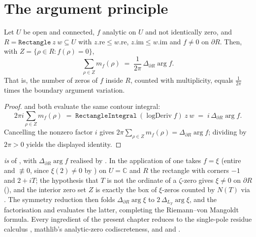 \section{The argument principle}
\label{sec:ap_main}

\begin{theorem}
\label{thm:ap_main}
\leanok
{}
Let $U$ be open and connected, $f$ analytic on $U$ and not identically zero, and
$R=\texttt{Rectangle}\ z\ w\subseteq U$ with $z.\mathrm{re}\le w.\mathrm{re}$,
$z.\mathrm{im}\le w.\mathrm{im}$ and $f\neq0$ on $\partial R$. Then, with
$Z=\{\rho\in R:f(\rho)=0\}$,
\[
  \sum_{\rho\in Z} m_f(\rho)
  \;=\; \frac{1}{2\pi}\,\Delta_{\partial R}\arg f .
\]
That is, the number of zeros of $f$ inside $R$, counted with multiplicity, equals
$\tfrac{1}{2\pi}$ times the boundary argument variation.
\end{theorem}

\begin{proof}
\leanok
{}
 and  both evaluate the same
contour integral:
\[
  2\pi i \sum_{\rho\in Z} m_f(\rho)
  \;=\; \texttt{RectangleIntegral}\ (\operatorname{logDeriv} f)\ z\ w
  \;=\; i\,\Delta_{\partial R}\arg f .
\]
Cancelling the nonzero factor $i$ gives $2\pi\sum_{\rho\in Z} m_f(\rho)
=\Delta_{\partial R}\arg f$; dividing by $2\pi>0$ yields the displayed identity.
\end{proof}

\begin{remark}
\label{rem:ap_scope}
 \emph{is}  of , with
$\Delta_{\partial R}\arg f$ realised by . In the application
of  one takes $f=\xi$ (entire and $\not\equiv0$, since
$\xi(2)\neq0$ by ) on $U=\mathbb C$ and $R$ the rectangle with
corners $-1$ and $2+iT$; the hypothesis that $T$ is not the ordinate of a $\zeta$-zero
gives $\xi\neq0$ on $\partial R$ (), and the interior zero set
$Z$ is exactly the box of $\xi$-zeros counted by $N(T)$ via
. The symmetry reduction  then folds
$\Delta_{\partial R}\arg\xi$ to $2\,\Delta_{L_T}\arg\xi$, and the factorisation
 and  evaluates the latter, completing the
Riemann--von Mangoldt formula. Every ingredient of the present chapter reduces to the
single-pole residue calculus , mathlib's analytic-zero
codiscreteness, and  and
.
\end{remark}
